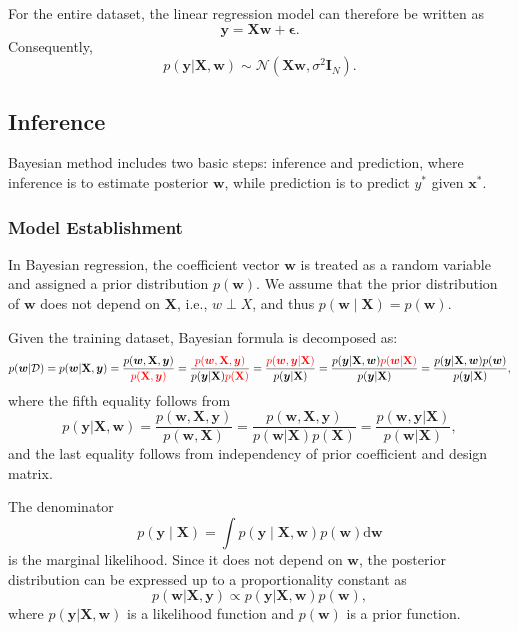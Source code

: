\documentclass[../Bayesian_Inference.tex]{subfiles}
\begin{document}
For the entire dataset, the linear regression model can therefore be written as
\[
    \bm{y} = \mathbf{X}\bm{w} + \bm{\epsilon}.
\]
Consequently,
\[
    p(\bm{y} | \mathbf{X}, \bm{w}) \sim \mathcal{N}(\mathbf{X}\bm{w}, \sigma^2 \mathbf{I}_N).
\]

\subsection{Inference}

Bayesian method includes two basic steps: inference and prediction, where inference is to estimate posterior $\bm{w}$, while prediction is to predict ${y}^{*}$ given $\bm{x}^{*}$.

\subsubsection{Model Establishment}

In Bayesian regression, the coefficient vector $\bm{w}$ is treated as a random variable and assigned a prior distribution $p(\bm w)$. We assume that the prior distribution of $\bm{w}$ does not depend on $\mathbf{X}$, i.e., $w\perp X$, and thus $p(\bm w\mid\mathbf X)=p(\bm w)$.

Given the training dataset, Bayesian formula is decomposed as: 
\[
    p(\bm{w} | \mathcal{D}) = p(\bm{w} | \mathbf{X}, \bm{y}) = \frac{p(\bm{w}, \mathbf{X}, \bm{y})}{\textcolor{red}{p(\mathbf{X}, \bm{y})}} = \frac{\textcolor{red}{p(\bm{w}, \mathbf{X}, \bm{y})}}{p(\bm{y}|\mathbf{X}) \textcolor{red}{p(\mathbf{X})} } = \frac{\textcolor{red}{p(\bm{w}, \bm{y} | \mathbf{X})}}{p(\bm{y}|\mathbf{X})} = \frac{p(\bm{y} | \mathbf{X}, \bm{w}) \textcolor{red}{p(\bm{w} | \mathbf{X})}}{p(\bm{y}|\mathbf{X})} = \frac{p(\bm{y} | \mathbf{X}, \bm{w}) p(\bm{w})}{p(\bm{y}|\mathbf{X})},
\]
where the fifth equality follows from
\[
    p(\bm{y} | \mathbf{X}, \bm{w}) = \frac{p(\bm{w}, \mathbf{X}, \bm{y})}{p(\bm{w}, \mathbf{X})} = \frac{p(\bm{w}, \mathbf{X}, \bm{y})}{ p(\bm{w} | \mathbf{X}) p(\mathbf{X})} = \frac{p(\bm{w}, \bm{y} | \mathbf{X})}{p(\bm{w} | \mathbf{X})},
\]
and the last equality follows from independency of prior coefficient and design matrix. 

The denominator 
\[
    p(\bm{y}\mid\mathbf{X}) = \int p(\bm{y}\mid\mathbf{X},\bm{w}) p(\bm{w})\mathrm{d}\bm{w}
\]  
is the marginal likelihood. Since it does not depend on $\bm{w}$, the posterior distribution can be expressed up to a proportionality constant as 
\[
    p(\bm{w} | \mathbf{X}, \bm{y}) \propto p(\bm{y} | \mathbf{X}, \bm{w}) p(\bm{w}),
\]
where $p(\bm{y} | \mathbf{X}, \bm{w})$ is a likelihood function and $p(\bm{w})$ is a prior function.
\end{document}
